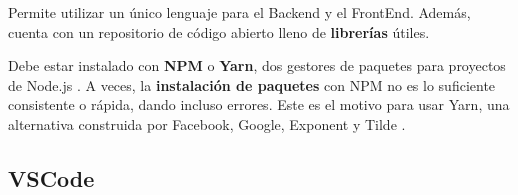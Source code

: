 \documentclass[12pt,twoside,titlepage]{report}
\begin{document}
Permite utilizar un único lenguaje para el Backend y el FrontEnd. Además, cuenta con un repositorio de código abierto lleno de \textbf{librerías} útiles. %

Debe estar instalado con \textbf{NPM} o \textbf{Yarn}, dos gestores de paquetes para proyectos de Node.js \cite{npm}. A veces, la \textbf{instalación de paquetes} con NPM no es lo suficiente consistente o rápida, dando incluso errores. Este es el motivo para usar Yarn, una alternativa construida por Facebook, Google, Exponent y Tilde \cite{yarn}\cite{npmyarn}.

\subsection{VSCode}
\label{sec:VSCode}
\end{document}
